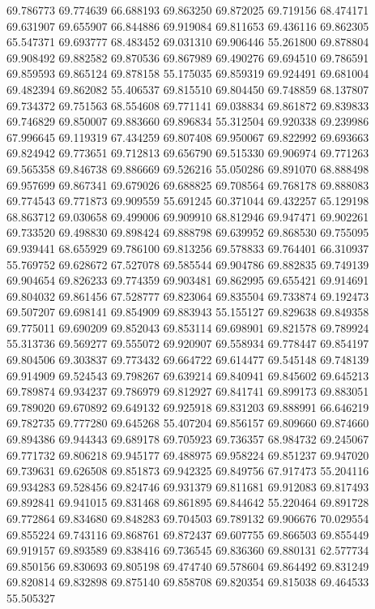 69.786773
69.774639
66.688193
69.863250
69.872025
69.719156
68.474171
69.631907
69.655907
66.844886
69.919084
69.811653
69.436116
69.862305
65.547371
69.693777
68.483452
69.031310
69.906446
55.261800
69.878804
69.908492
69.882582
69.870536
69.867989
69.490276
69.694510
69.786591
69.859593
69.865124
69.878158
55.175035
69.859319
69.924491
69.681004
69.482394
69.862082
55.406537
69.815510
69.804450
69.748859
68.137807
69.734372
69.751563
68.554608
69.771141
69.038834
69.861872
69.839833
69.746829
69.850007
69.883660
69.896834
55.312504
69.920338
69.239986
67.996645
69.119319
67.434259
69.807408
69.950067
69.822992
69.693663
69.824942
69.773651
69.712813
69.656790
69.515330
69.906974
69.771263
69.565358
69.846738
69.886669
69.526216
55.050286
69.891070
68.888498
69.957699
69.867341
69.679026
69.688825
69.708564
69.768178
69.888083
69.774543
69.771873
69.909559
55.691245
60.371044
69.432257
65.129198
68.863712
69.030658
69.499006
69.909910
68.812946
69.947471
69.902261
69.733520
69.498830
69.898424
69.888798
69.639952
69.868530
69.755095
69.939441
68.655929
69.786100
69.813256
69.578833
69.764401
66.310937
55.769752
69.628672
67.527078
69.585544
69.904786
69.882835
69.749139
69.904654
69.826233
69.774359
69.903481
69.862995
69.655421
69.914691
69.804032
69.861456
67.528777
69.823064
69.835504
69.733874
69.192473
69.507207
69.698141
69.854909
69.883943
55.155127
69.829638
69.849358
69.775011
69.690209
69.852043
69.853114
69.698901
69.821578
69.789924
55.313736
69.569277
69.555072
69.920907
69.558934
69.778447
69.854197
69.804506
69.303837
69.773432
69.664722
69.614477
69.545148
69.748139
69.914909
69.524543
69.798267
69.639214
69.840941
69.845602
69.645213
69.789874
69.934237
69.786979
69.812927
69.841741
69.899173
69.883051
69.789020
69.670892
69.649132
69.925918
69.831203
69.888991
66.646219
69.782735
69.777280
69.645268
55.407204
69.856157
69.809660
69.874660
69.894386
69.944343
69.689178
69.705923
69.736357
68.984732
69.245067
69.771732
69.806218
69.945177
69.488975
69.958224
69.851237
69.947020
69.739631
69.626508
69.851873
69.942325
69.849756
67.917473
55.204116
69.934283
69.528456
69.824746
69.931379
69.811681
69.912083
69.817493
69.892841
69.941015
69.831468
69.861895
69.844642
55.220464
69.891728
69.772864
69.834680
69.848283
69.704503
69.789132
69.906676
70.029554
69.855224
69.743116
69.868761
69.872437
69.607755
69.866503
69.855449
69.919157
69.893589
69.838416
69.736545
69.836360
69.880131
62.577734
69.850156
69.830693
69.805198
69.474740
69.578604
69.864492
69.831249
69.820814
69.832898
69.875140
69.858708
69.820354
69.815038
69.464533
55.505327
